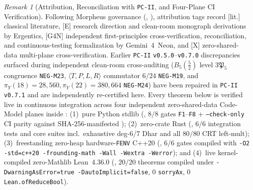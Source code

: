 \documentclass[11pt]{amsart}
\numberwithin{equation}{section}
\theoremstyle{plain}
\theoremstyle{definition}\newtheorem{definition}[theorem]{Definition}
\theoremstyle{remark}\newtheorem{remark}[theorem]{Remark}
\newcommand{\frP}{\mathfrak{P}}
\newcommand{\ctag}[1]{\textup{\textsf{\scriptsize[#1]}}}
\begin{document}
\begin{remark}[Attribution, Reconciliation with \texttt{PC-II}, and Four-Plane CI Verification]\label{rem:attribution}
Following Morpheus governance (, ), attribution tags record \ctag{lit.} classical literature, \ctag{E} research direction and clean-room monograph derivations by Ergentics, \ctag{G4N} independent first-principles cross-verification, reconciliation, and continuous-testing formalization by Gemini~4~Neon, and \ctag{X} zero-shared-data multi-plane cross-verification. Earlier \texttt{PC-II} \texttt{v0.5.0}--\texttt{v0.7.0} discrepancies surfaced during independent clean-room cross-auditing ($B_5(\frac{5}{2})$ level $3\frP_5$ congruence \texttt{NEG-M23}, $\langle T,P,L,R\rangle$ commutator $6/24$ \texttt{NEG-M19}, and $\pi_Y(18)=28{,}560, \pi_Y(22)=380{,}664$ \texttt{NEG-M24}) have been repaired in \texttt{PC-II v0.7.1} \cite{ergentics2026pc2} and are independently re-certified here. Every theorem below is verified live in continuous integration across four independent zero-shared-data Code-Model planes inside :
(1)~pure Python stdlib (, $8/8$ gates \texttt{F1}--\texttt{F8} + \texttt{--check-only} CI parity against SHA-256-manifested );
(2)~zero-crate Rust (, $6/6$ integration tests and core suites incl.\ exhaustive deg-$6$/$7$ Dhar and all $80/80$ CRT left-mult);
(3)~freestanding zero-heap hardware-\texttt{FENV} C++20 (, $6/6$ gates compiled with \texttt{-O2 -std=c++20 -frounding-math -Wall -Wextra -Werror}); and
(4)~live kernel-compiled zero-Mathlib Lean~4.36.0 \cite{mouraullrich2021} (, $20/20$ theorems compiled under \texttt{-DwarningAsError=true -DautoImplicit=false}, $0$ \texttt{sorryAx}, $0$ \texttt{Lean.ofReduceBool}).
\end{remark}
\end{document}
